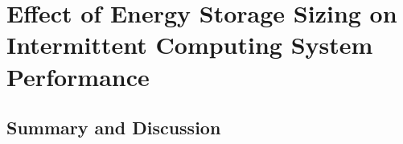 \chapter{Effect of Energy Storage Sizing on Intermittent Computing System Performance}







\section{Summary and Discussion}
